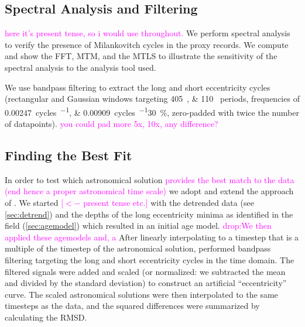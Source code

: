 \documentclass[draft]{agujournal2019}
\newcommand{\rez}{\textcolor{magenta}}
\begin{document}
\subsection{Spectral Analysis and Filtering}\label{sec:spectral}

\rez{here it's present tense, so i would use throughout.}
We perform spectral analysis to verify the presence of Milankovitch cycles in the proxy records.
We compute and show the \gls{FFT}, %
\gls{MTM}, and the \gls{MTLS} to illustrate the sensitivity of the spectral analysis to the analysis tool used.

We use bandpass filtering to extract the long and short eccentricity cycles (rectangular and Gaussian windows targeting \qtylist{405;110}{\kiloyear} periods, frequencies of \qtylist{0.00247;0.00909}{cycles\per\kiloyear}\textpm\qty{30}{\percent}, zero-padded with twice the number of datapoints).
\rez{you could pad more 5x, 10x, any difference?}


\subsection{Finding the Best Fit}\label{sec:algorithm}

In order to test which astronomical solution \rez{provides the best match to the data (end hence a proper astronomical time scale)} we adopt and extend the approach of .
We started \rez{[$<-$ present tense etc.]} with the detrended data (see \cref{sec:detrend}) and the depths of the long eccentricity minima as identified in the field (\cref{sec:agemodel}) which resulted in an initial age model.
\rez{drop:We then applied these agemodels and, a} After linearly interpolating to a timestep that is a multiple of the timestep of the astronomical solution, performed bandpass filtering targeting the long and short eccentricity cycles in the time domain.
The filtered signals were added and scaled (or normalized: we subtracted the mean and divided by the standard deviation) to construct an artificial ``eccentricity'' curve.
The scaled astronomical solutions were then interpolated to the same timesteps as the data, and the squared differences were summarized by calculating the \gls{RMSD}.
\end{document}
